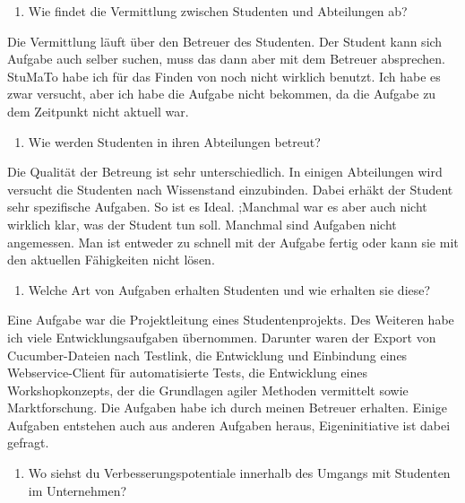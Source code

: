 \documentclass[
  12pt,
  ngerman,
  a4paper,
]{article}
\providecommand{\tightlist}{%
  \setlength{\itemsep}{0pt}\setlength{\parskip}{0pt}}
\begin{document}
\begin{enumerate}
\def\labelenumi{\arabic{enumi}.}
\setcounter{enumi}{4}
\tightlist
\item
  Wie findet die Vermittlung zwischen Studenten und Abteilungen ab?
\end{enumerate}

Die Vermittlung läuft über den Betreuer des Studenten. Der Student kann
sich Aufgabe auch selber suchen, muss das dann aber mit dem Betreuer
absprechen. StuMaTo habe ich für das Finden von noch nicht wirklich
benutzt. Ich habe es zwar versucht, aber ich habe die Aufgabe nicht
bekommen, da die Aufgabe zu dem Zeitpunkt nicht aktuell war.

\begin{enumerate}
\def\labelenumi{\arabic{enumi}.}
\setcounter{enumi}{5}
\tightlist
\item
  Wie werden Studenten in ihren Abteilungen betreut?
\end{enumerate}

Die Qualität der Betreung ist sehr unterschiedlich. In einigen
Abteilungen wird versucht die Studenten nach Wissenstand einzubinden.
Dabei erhäkt der Student sehr spezifische Aufgaben. So ist es Ideal.
;Manchmal war es aber auch nicht wirklich klar, was der Student tun
soll. Manchmal sind Aufgaben nicht angemessen. Man ist entweder zu
schnell mit der Aufgabe fertig oder kann sie mit den aktuellen
Fähigkeiten nicht lösen.

\begin{enumerate}
\def\labelenumi{\arabic{enumi}.}
\setcounter{enumi}{6}
\tightlist
\item
  Welche Art von Aufgaben erhalten Studenten und wie erhalten sie diese?
\end{enumerate}

Eine Aufgabe war die Projektleitung eines Studentenprojekts. Des
Weiteren habe ich viele Entwicklungsaufgaben übernommen. Darunter waren
der Export von Cucumber-Dateien nach Testlink, die Entwicklung und
Einbindung eines Webservice-Client für automatisierte Tests, die
Entwicklung eines Workshopkonzepts, der die Grundlagen agiler Methoden
vermittelt sowie Marktforschung. Die Aufgaben habe ich durch meinen
Betreuer erhalten. Einige Aufgaben entstehen auch aus anderen Aufgaben
heraus, Eigeninitiative ist dabei gefragt.

\begin{enumerate}
\def\labelenumi{\arabic{enumi}.}
\setcounter{enumi}{7}
\tightlist
\item
  Wo siehst du Verbesserungspotentiale innerhalb des Umgangs mit
  Studenten im Unternehmen?
\end{enumerate}
\end{document}
